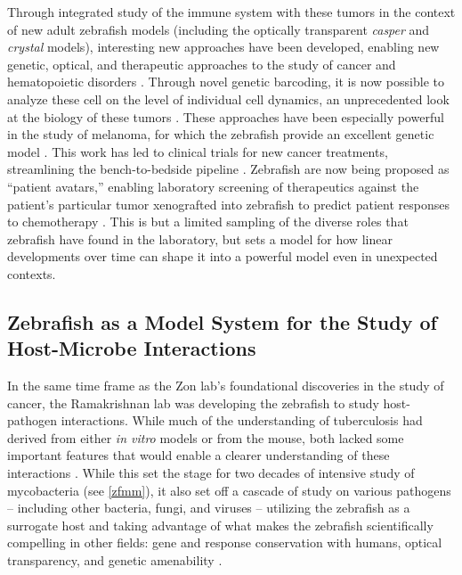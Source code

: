 Through integrated study of the immune system with these tumors in the context of new adult zebrafish models (including the optically transparent \textit{casper} and \textit{crystal} models), interesting new approaches have been developed, enabling new genetic, optical, and therapeutic approaches to the study of cancer \citep{Stern2003, White2013, Yan2019, GomezAbenza2019, Hason2019, Yan2021} and hematopoietic disorders \citep{deJong2011, Tang2014}. Through novel genetic barcoding, it is now possible to analyze these cell on the level of individual cell dynamics, an unprecedented look at the biology of these tumors \citep{Sankaran2022}. These approaches have been especially powerful in the study of melanoma, for which the zebrafish provide an excellent genetic model \citep{Kaufman2016}. This work has led to clinical trials for new cancer treatments, streamlining the bench\hyp{}to\hyp{}bedside pipeline \citep{Hanna2021}. Zebrafish are now being proposed as ``patient avatars,'' enabling laboratory screening of therapeutics against the patient's particular tumor xenografted into zebrafish to predict patient responses to chemotherapy \citep{Li2012, Sertori2016, Yan2019, Fazio2020, Sertori2022}. This is but a limited sampling of the diverse roles that zebrafish have found in the laboratory, but sets a model for how linear developments over time can shape it into a powerful model even in unexpected contexts.

\subsection{Zebrafish as a Model System for the Study of Host\hyp{}Microbe Interactions}\label{zfhmi}

In the same time frame as the Zon lab's foundational discoveries in the study of cancer, the Ramakrishnan lab was developing the zebrafish to study host\hyp{}pathogen interactions. While much of the understanding of tuberculosis had derived from either \textit{in vitro} models or from the mouse, both lacked some important features that would enable a clearer understanding of these interactions \citep{Davis2002}. While this set the stage for two decades of intensive study of mycobacteria (see \autoref{zfmm}), it also set off a cascade of study on various pathogens -- including other bacteria, fungi, and viruses -- utilizing the zebrafish as a surrogate host and taking advantage of what makes the zebrafish scientifically compelling in other fields: gene and response conservation with humans, optical transparency, and genetic amenability \citep{Kanther2010, Angosto2014, Levraud2014}.

